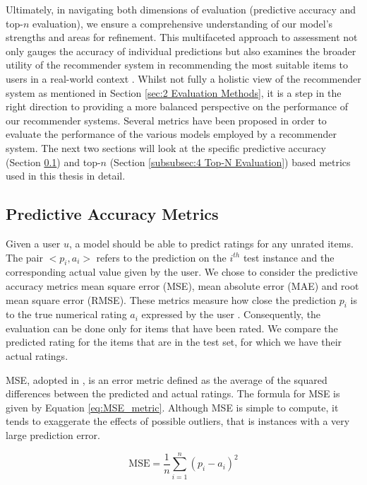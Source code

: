 Ultimately, in navigating both dimensions of evaluation (predictive accuracy and top-$n$ evaluation), we ensure a comprehensive understanding of our model's strengths and areas for refinement. This multifaceted approach to assessment not only gauges the accuracy of individual predictions but also examines the broader utility of the recommender system in recommending the most suitable items to users in a real-world context \cite{herlocker2004evaluating}. Whilst not fully a holistic view of the recommender system as mentioned in Section \ref{sec:2 Evaluation Methods}, it is a step in the right direction to providing a more balanced perspective on the performance of our recommender systems. Several metrics have been proposed in order to evaluate the performance of the various models employed by a recommender system. The next two sections will look at the specific predictive accuracy (Section \ref{subsubsec:4 Predictive Accuracy}) and top-$n$ (Section \ref{subsubsec:4 Top-N Evaluation}) based metrics used in this thesis in detail. 


\subsection{Predictive Accuracy Metrics}
\label{subsubsec:4 Predictive Accuracy}

Given a user $u$, a model should be able to predict ratings for any unrated items. The pair $<p_i, a_i>$ refers to the prediction on the $i^{th}$ test instance and the corresponding actual value given by the user. We chose to consider the predictive accuracy metrics mean square error (MSE), mean absolute error (MAE) and root mean square error (RMSE).  These metrics measure how close the prediction $p_i$ is to the true numerical rating $a_i$ expressed by the user \cite{herlocker2004evaluating}. Consequently, the evaluation can be done only for items that have been rated. We compare the predicted rating for the items that are in the test set, for which we have their actual ratings. 

MSE, adopted in \cite{buczak2002personalization}, is an error metric defined as the average of the squared differences between the predicted and actual ratings. The formula for MSE is given by Equation \ref{eq:MSE_metric}. Although MSE is simple to compute, it tends to exaggerate the effects of possible outliers, that is instances with a very large prediction error.

\begin{equation}
    \mathrm{MSE}=\frac{1}{n} \sum_{i=1}^n\left(p_i-a_i\right)^2
    \label{eq:MSE_metric}
\end{equation}

